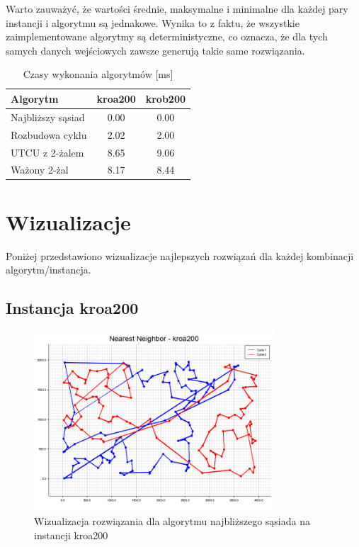 \documentclass[12pt,a4paper]{article}
\begin{document}
Warto zauważyć, że wartości średnie, maksymalne i minimalne dla każdej pary instancji i algorytmu są jednakowe. Wynika to z faktu, że wszystkie zaimplementowane algorytmy są deterministyczne, co oznacza, że dla tych samych danych wejściowych zawsze generują takie same rozwiązania.

\begin{table}[H]
\centering
\caption{Czasy wykonania algorytmów [ms]}
\begin{tabular}{lcc}
\toprule
\textbf{Algorytm} & \textbf{kroa200} & \textbf{krob200} \\
\midrule
Najbliższy sąsiad & 0.00 & 0.00 \\
Rozbudowa cyklu & 2.02 & 2.00 \\
UTCU z 2-żalem & 8.65 & 9.06 \\
Ważony 2-żal & 8.17 & 8.44 \\
\bottomrule
\end{tabular}
\end{table}

\section{Wizualizacje}
Poniżej przedstawiono wizualizacje najlepszych rozwiązań dla każdej kombinacji algorytm/instancja.

\subsection{Instancja kroa200}

\begin{figure}[H]
\centering
\includegraphics[width=0.8\textwidth]{figures/kroa200_Nearest_Neighbor.png}
\caption{Wizualizacja rozwiązania dla algorytmu najbliższego sąsiada na instancji kroa200}
\end{figure}
\end{document}
